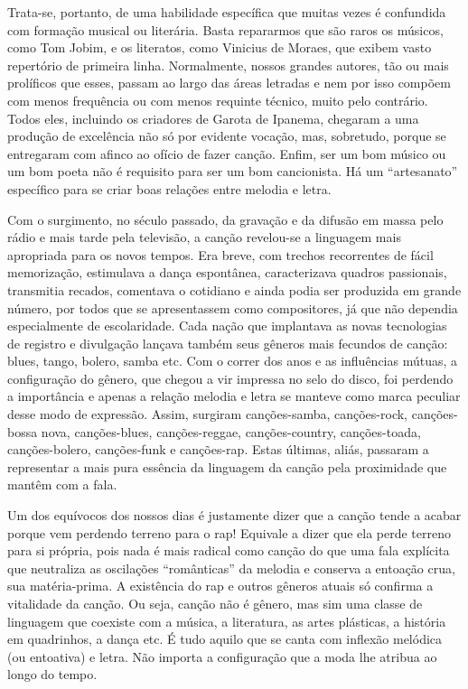 Trata-se, portanto, de uma habilidade específica que muitas vezes é
confundida com formação musical ou literária. Basta repararmos que são
raros os músicos, como Tom Jobim, e os literatos, como Vinicius de
Moraes, que exibem vasto repertório de primeira linha. Normalmente,
nossos grandes autores, tão ou mais prolíficos que esses, passam ao
largo das áreas letradas e nem por isso compõem com menos frequência ou
com menos requinte técnico, muito pelo contrário. Todos eles, incluindo
os criadores de Garota de Ipanema, chegaram a uma produção de excelência
não só por evidente vocação, mas, sobretudo, porque se entregaram com
afinco ao ofício de fazer canção. Enfim, ser um bom músico ou um bom
poeta não é requisito para ser um bom cancionista. Há um ``artesanato''
específico para se criar boas relações entre melodia e letra.

Com o surgimento, no século passado, da gravação e da difusão em massa
pelo rádio e mais tarde pela televisão, a canção revelou-se a linguagem
mais apropriada para os novos tempos. Era breve, com trechos recorrentes
de fácil memorização, estimulava a dança espontânea, caracterizava
quadros passionais, transmitia recados, comentava o cotidiano e ainda
podia ser produzida em grande número, por todos que se apresentassem
como compositores, já que não dependia especialmente de escolaridade.
Cada nação que implantava as novas tecnologias de registro e divulgação
lançava também seus gêneros mais fecundos de canção: blues, tango,
bolero, samba etc. Com o correr dos anos e as influências mútuas, a
configuração do gênero, que chegou a vir impressa no selo do disco, foi
perdendo a importância e apenas a relação melodia e letra se manteve
como marca peculiar desse modo de expressão. Assim, surgiram
canções-samba, canções-rock, canções-bossa nova, canções-blues,
canções-reggae, canções-country, canções-toada, canções-bolero, canções-funk e canções-rap. Estas últimas, aliás, passaram a representar a mais
pura essência da linguagem da canção pela proximidade que mantêm com a
fala.

Um dos equívocos dos nossos dias é justamente dizer que a canção tende a
acabar porque vem perdendo terreno para o rap! Equivale a dizer que ela
perde terreno para si própria, pois nada é mais radical como canção do
que uma fala explícita que neutraliza as oscilações ``românticas'' da
melodia e conserva a entoação crua, sua matéria-prima. A existência do
rap e outros gêneros atuais só confirma a vitalidade da canção. Ou seja,
canção não é gênero, mas sim uma classe de linguagem que coexiste com a
música, a literatura, as artes plásticas, a história em quadrinhos, a
dança etc. É tudo aquilo que se canta com inflexão melódica (ou
entoativa) e letra. Não importa a configuração que a moda lhe atribua ao
longo do tempo.

